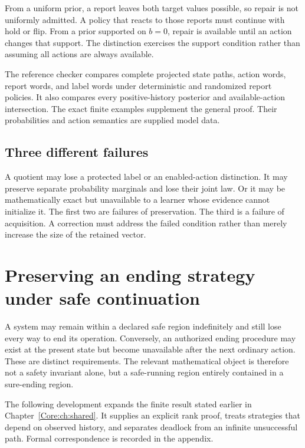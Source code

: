 From a uniform prior, a report leaves both target values possible, so repair is not uniformly admitted. A policy that reacts to those reports must continue with hold or flip. From a prior supported on $b=0$, repair is available until an action changes that support. The distinction exercises the support condition rather than assuming all actions are always available.

The reference checker compares complete projected state paths, action words, report words, and label words under deterministic and randomized report policies. It also compares every positive-history posterior and available-action intersection. The exact finite examples supplement the general proof. Their probabilities and action semantics are supplied model data.

\section{Three different failures}
A quotient may lose a protected label or an enabled-action distinction. It may preserve separate probability marginals and lose their joint law. Or it may be mathematically exact but unavailable to a learner whose evidence cannot initialize it. The first two are failures of preservation. The third is a failure of acquisition. A correction must address the failed condition rather than merely increase the size of the retained vector.


\chapter{Preserving an ending strategy under safe continuation}\label{Core:book:chapter-11}
\setcounter{section}{0}\label{Core:ch:endinganalysis}

A system may remain within a declared safe region indefinitely and still lose every way to end its operation. Conversely, an authorized ending procedure may exist at the present state but become unavailable after the next ordinary action. These are distinct requirements. The relevant mathematical object is therefore not a safety invariant alone, but a safe-running region entirely contained in a sure-ending region.

The following development expands the finite result stated earlier in Chapter~\ref{Core:ch:shared}. It supplies an explicit rank proof, treats strategies that depend on observed history, and separates deadlock from an infinite unsuccessful path. Formal correspondence is recorded in the appendix.

